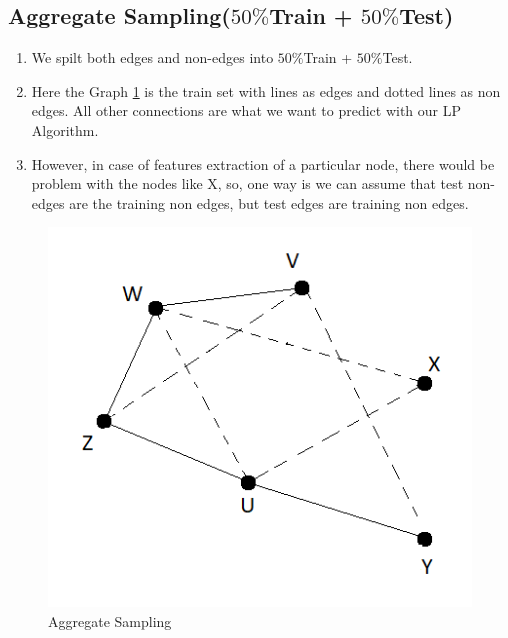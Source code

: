 \documentclass{article}
\begin{document}
\subsection{Aggregate Sampling($50\%$Train + $50\%$Test)}
\begin{enumerate}
    \item We spilt both edges and non-edges into $50\%$Train + $50\%$Test.
    \item Here the Graph \ref{fig:Aggregate_Sampling} is the train set with lines as edges and dotted lines as non edges. All other connections are what we want to predict with our LP Algorithm. 
    \item However, in case of features extraction of a particular node, there would be problem with the nodes like X, so, one way is  we can assume that test non-edges are the training non edges, but test edges are training non edges.
\end{enumerate}
\begin{figure}[h!]
    \centering
    \includegraphics[width=0.3\linewidth]{aggregate.png}
    \caption{Aggregate Sampling}
    \label{fig:Aggregate_Sampling}
\end{figure}
\end{document}

